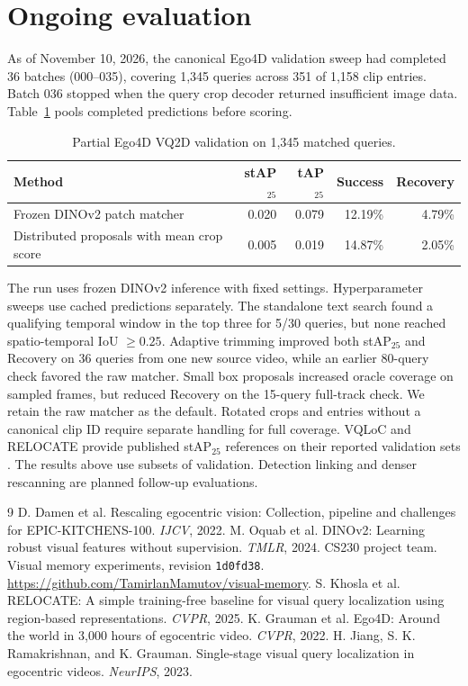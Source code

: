 \documentclass{article}
\begin{document}
\section{Ongoing evaluation}
As of November 10, 2026, the canonical Ego4D validation sweep had completed 36 batches (000--035), covering 1,345 queries across 351 of 1,158 clip entries. Batch 036 stopped when the query crop decoder returned insufficient image data. Table~\ref{tab:partial-sweep} pools completed predictions before scoring.

\begin{table}[ht]
\centering
\caption{Partial Ego4D VQ2D validation on 1,345 matched queries.}
\label{tab:partial-sweep}
\begin{tabular}{lrrrr}
\toprule
Method & stAP$_{25}$ & tAP$_{25}$ & Success & Recovery \\
\midrule
Frozen DINOv2 patch matcher & 0.020 & 0.079 & 12.19\% & 4.79\% \\
Distributed proposals with mean crop score & 0.005 & 0.019 & 14.87\% & 2.05\% \\
\bottomrule
\end{tabular}
\end{table}

The run uses frozen DINOv2 inference with fixed settings. Hyperparameter sweeps use cached predictions separately. The standalone text search found a qualifying temporal window in the top three for 5/30 queries, but none reached spatio-temporal IoU $\geq 0.25$. Adaptive trimming improved both stAP$_{25}$ and Recovery on 36 queries from one new source video, while an earlier 80-query check favored the raw matcher. Small box proposals increased oracle coverage on sampled frames, but reduced Recovery on the 15-query full-track check. We retain the raw matcher as the default. Rotated crops and entries without a canonical clip ID require separate handling for full coverage. VQLoC and RELOCATE provide published stAP$_{25}$ references on their reported validation sets \citep{vqloc,relocate}. The results above use subsets of validation. Detection linking and denser rescanning are planned follow-up evaluations.

\begin{thebibliography}{9}
 D. Damen et al. Rescaling egocentric vision: Collection, pipeline and challenges for EPIC-KITCHENS-100. \emph{IJCV}, 2022.
 M. Oquab et al. DINOv2: Learning robust visual features without supervision. \emph{TMLR}, 2024.
 CS230 project team. Visual memory experiments, revision \texttt{1d0fd38}. \url{https://github.com/TamirlanMamutov/visual-memory}.
 S. Khosla et al. RELOCATE: A simple training-free baseline for visual query localization using region-based representations. \emph{CVPR}, 2025.
 K. Grauman et al. Ego4D: Around the world in 3,000 hours of egocentric video. \emph{CVPR}, 2022.
 H. Jiang, S. K. Ramakrishnan, and K. Grauman. Single-stage visual query localization in egocentric videos. \emph{NeurIPS}, 2023.
\end{thebibliography}
\end{document}
